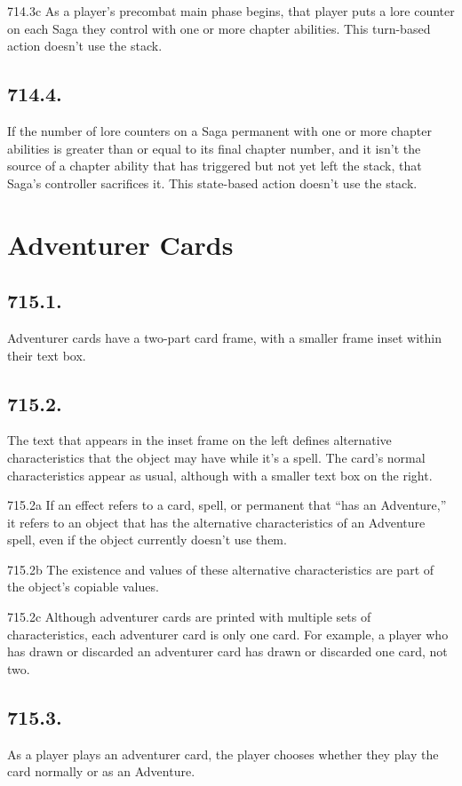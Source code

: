 714.3c As a player’s precombat main phase begins, that player puts a lore counter on each Saga they control with one or more chapter abilities. This turn-based action doesn’t use the stack.

\subsection*{714.4.}
If the number of lore counters on a Saga permanent with one or more chapter abilities is greater than or equal to its final chapter number, and it isn’t the source of a chapter ability that has triggered but not yet left the stack, that Saga’s controller sacrifices it. This state-based action doesn’t use the stack.

\section{Adventurer Cards}
\subsection*{715.1.}
Adventurer cards have a two-part card frame, with a smaller frame inset within their text box.

\subsection*{715.2.}
The text that appears in the inset frame on the left defines alternative characteristics that the object may have while it’s a spell. The card’s normal characteristics appear as usual, although with a smaller text box on the right.

715.2a If an effect refers to a card, spell, or permanent that “has an Adventure,” it refers to an object that has the alternative characteristics of an Adventure spell, even if the object currently doesn’t use them.

715.2b The existence and values of these alternative characteristics are part of the object’s copiable values.

715.2c Although adventurer cards are printed with multiple sets of characteristics, each adventurer card is only one card. For example, a player who has drawn or discarded an adventurer card has drawn or discarded one card, not two.

\subsection*{715.3.}
As a player plays an adventurer card, the player chooses whether they play the card normally or as an Adventure.

